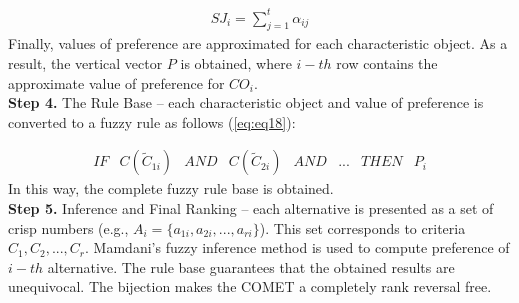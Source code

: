 \begin{equation}
\begin{array}{l}
SJ_i=\sum^{t}_{j=1}\alpha_{ij}
\end{array}
\label{eq:eq16}
\end{equation}
Finally, values of preference are approximated for each characteristic object. As a result, the vertical vector $P$ is obtained, where $i-th$ row contains the approximate  value of preference for $CO_i$. \\

\textbf{Step 4.} {The Rule Base} --
each characteristic object and value of preference is converted to a fuzzy rule as follows (\ref{eq:eq18}):

\begin{equation}
\begin{array}{llllllll}
IF & C(\tilde{C}_{1i}) & AND & C(\tilde{C}_{2i}) & AND & ... & THEN & P_i
\end{array}
\label{eq:eq18}
\end{equation}
In this way, the complete fuzzy rule base is obtained. \\

\textbf{Step 5.} {Inference and Final Ranking} --
each alternative is presented as a set of crisp numbers (e.g., $A_i=\{a_{1i}, a_{2i}, ..., a_{ri}\}$). This set corresponds to criteria $C_1, C_2, ..., C_r$. Mamdani's fuzzy inference method is used to compute preference of $i-th$ alternative. The rule base guarantees that the obtained results are unequivocal. The bijection makes the COMET a completely rank reversal free.